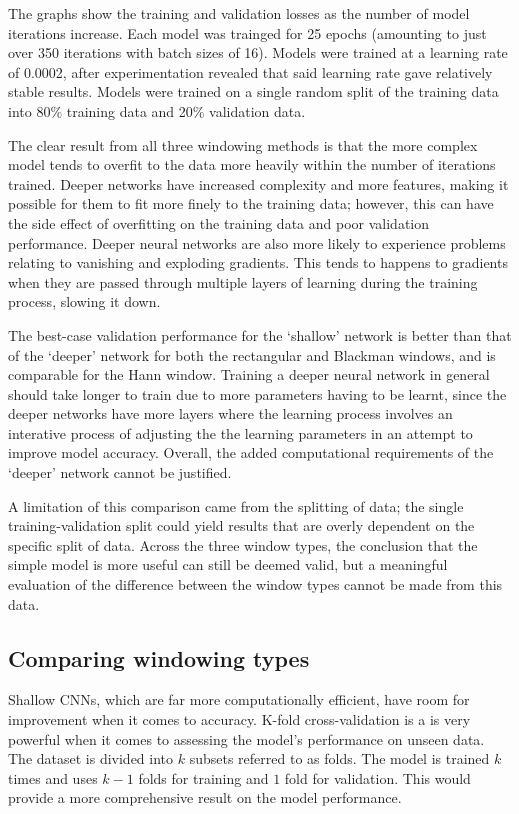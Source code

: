 \documentclass[class=report,11pt,crop=false]{standalone}
\begin{document}
The graphs show the training and validation losses as the number of model iterations increase. Each model was trainged for 25 epochs (amounting to just over 350 iterations with batch sizes of 16). Models were trained at a learning rate of 0.0002, after experimentation revealed that said learning rate gave relatively stable results. Models were trained on a single random split of the training data into 80\% training data and 20\% validation data.

The clear result from all three windowing methods is that the more complex model tends to overfit to the data more heavily within the number of iterations trained. Deeper networks have increased complexity and more features, making it possible for them to fit more finely to the training data; however, this can have the side effect of overfitting on the training data and poor validation performance. Deeper neural networks are also more likely to experience problems relating to vanishing and exploding gradients. This tends to happens to gradients when they are passed through multiple layers of learning during the training process, slowing it down.

The best-case validation performance for the `shallow' network is better than that of the `deeper' network for both the rectangular and Blackman windows, and is comparable for the Hann window. Training a deeper neural network in general should take longer to train due to more parameters having to be learnt, since the deeper networks have more layers where the learning process involves an interative process of adjusting the the learning parameters in an attempt to improve model accuracy. Overall, the added computational requirements of the `deeper' network cannot be justified.

A limitation of this comparison came from the splitting of data; the single training-validation split could yield results that are overly dependent on the specific split of data. Across the three window types, the conclusion that the simple model is more useful can still be deemed valid, but a meaningful evaluation of the difference between the window types cannot be made from this data.



\subsection{Comparing windowing types} \label{ss:windowtypes}


Shallow CNNs, which are far more computationally efficient, have room for improvement when it comes to accuracy. K-fold cross-validation is a is very powerful when it comes to assessing the model's performance on unseen data. The dataset is divided into $k$ subsets referred to as folds. The model is trained $k$ times and uses $k-1$ folds for training and $1$ fold for validation. This would provide a more comprehensive result on the model performance. 
\end{document}
